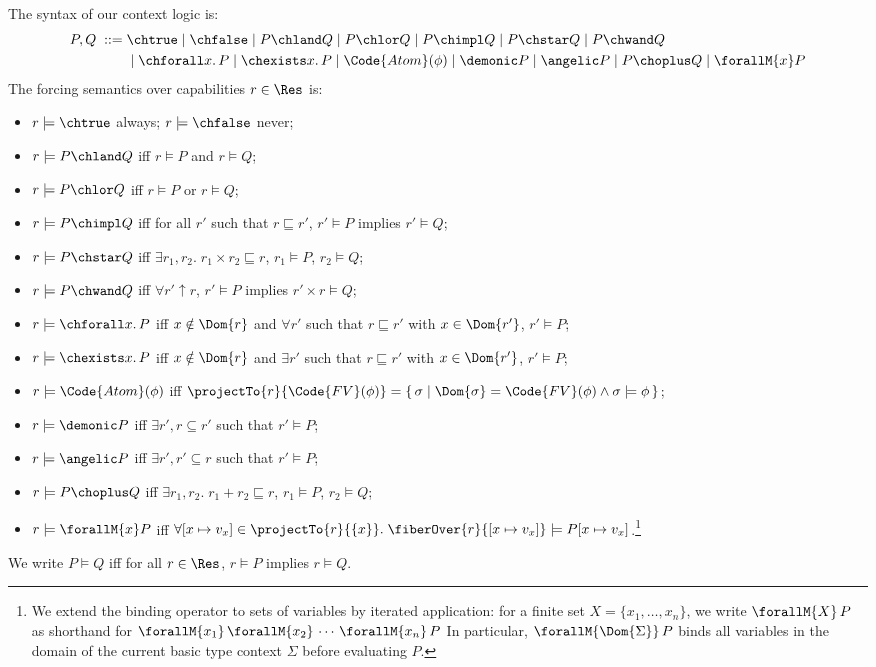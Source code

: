 \begin{definition}\label{def:context-logic}
  The syntax of our context logic is:
  \begin{align*}
    P, Q \;::=\; &\chtrue \mid \chfalse \mid P \chland Q \mid P \chlor Q \mid P \chimpl Q \mid P \chstar Q \mid P \chwand Q
    \\& \mid \chforall x.\, P \mid \chexists x.\, P \mid \Code{Atom}(\phi)
    \mid \demonic P \mid \angelic P \mid P \choplus Q \mid \forallM{x} P
  \end{align*}
  The forcing semantics over capabilities $r \in \Res$ is:
  \begin{itemize}
  \item $r \models \chtrue$ always; \quad $r \models \chfalse$ never;
  \item $r \models P \chland Q$ iff $r \models P$ and $r \models Q$;
  \item $r \models P \chlor Q$ iff $r \models P$ or $r \models Q$;
  \item $r \models P \chimpl Q$ iff for all $r'$ such that $r \sqsubseteq r'$, $r' \models P$ implies $r' \models Q$;
  \item $r \models P \chstar Q$ iff $\exists r_1, r_2.\; r_1 \times r_2 \sqsubseteq r$,\; $r_1 \models P$,\; $r_2 \models Q$;
  \item $r \models P \chwand Q$ iff $\forall r' \uparrow r$,\; $r' \models P$ implies $r' \times r \models Q$;
  \item $r \models \chforall x.\, P$ iff $x \notin \Dom{r}$ and $\forall r'$ such that $r \sqsubseteq r'$ with $x \in \Dom{r'}$,\; $r' \models P$;
  \item $r \models \chexists x.\, P$ iff $x \notin \Dom{r}$ and $\exists r'$ such that $r \sqsubseteq r'$ with $x \in \Dom{r'}$,\; $r' \models P$;
  \item $r \models \Code{Atom}(\phi)$ iff $\projectTo{r}{\Code{FV}(\phi)} = \{\,\sigma \mid \Dom{\sigma} = \Code{FV}(\phi) \land \sigma \models \phi\,\}$;
  \item $r \models \demonic P$ iff $\exists r', r \subseteq r'$ such that $r' \models P$;
  \item $r \models \angelic P$ iff $\exists r', r' \subseteq r$ such that $r' \models P$;
  \item $r \models P \choplus Q$ iff $\exists r_1, r_2.\; r_1 + r_2 \sqsubseteq r$,\; $r_1 \models P$,\; $r_2 \models Q$;
  \item $r \models \forallM{x} P$ iff $\forall [x \mapsto v_x] \in \projectTo{r}{\{x\}}.\; \fiberOver{r}{[x \mapsto v_x]} \models P[x \mapsto v_x]$.\footnote{
We extend the binding operator to sets of variables by iterated
application: for a finite set $X = \{x_1, \ldots, x_n\}$,
we write $\forallM{X}\, P$ as shorthand
for
$\forallM{x_1}\,\forallM{x_2}\,\cdots\,\forallM{x_n}\,P$
In particular,
$\forallM{\Dom{\Sigma}}\, P$ binds all
variables in the domain of the current basic type context $\Sigma$
before evaluating $P$.}
  \end{itemize}
  We write $P \models Q$ iff for all $r \in \Res$, $r \models P$ implies $r \models Q$.
\end{definition}


